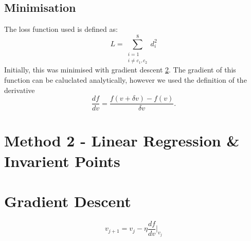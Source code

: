 \documentclass[11pt]{article}
\begin{document}
\subsection{Minimisation}
\label{sec:minimisation}
The loss function used is defined as:
\begin{equation}
    L = \sum\limits_{\substack{i=1 \\ i\neq c_1, c_2}}^{8} d_i^2
    \label{eq:loss}
\end{equation}
Initially, this was minimised with gradient descent \ref{app:gradient-descent}. The gradient of this function can be caluclated analytically, however we used the definition of the derivative
\begin{equation}
    \frac{df}{dv} = \frac{f(v + \delta v) - f(v)}{\delta v}.
    \label{eq:grad}
\end{equation}



\section{Method 2 - Linear Regression \& Invarient Points}
\label{sec:linreg}


\appendix
\section{Gradient Descent}
\label{app:gradient-descent}
\begin{equation}
    v_{j+1} = v_j - \eta \frac{df}{dv}\Bigr|_{v_j}
    \label{eq:iter}
\end{equation}
\end{document}
